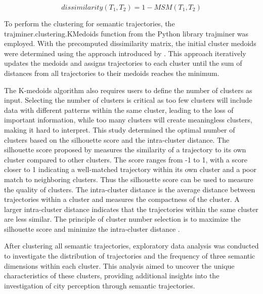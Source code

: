 \documentclass{article}
\theoremstyle{remark}
\begin{document}
\begin{equation} \label{eq:dissimilarity}
    dissimilarity(T_{1},T_{2}) = 1-MSM(T_{1},T_{2})
\end{equation}

To perform the clustering for semantic trajectories, the trajminer.clustering.KMedoids function from the Python library trajminer was employed. With the precomputed dissimilarity matrix, the initial cluster medoids were determined using the approach introduced by \cite{park_simple_2009}. This approach iteratively updates the medoids and assigns trajectories to each cluster until the sum of distances from all trajectories to their medoids reaches the minimum.

The K-medoids algorithm also requires users to define the number of clusters as input. Selecting the number of clusters is critical as too few clusters will include data with different patterns within the same cluster, leading to the loss of important information, while too many clusters will create meaningless clusters, making it hard to interpret. This study determined the optimal number of clusters based on the silhouette score and the intra-cluster distance. The silhouette score proposed by \cite{rousseeuw_silhouettes_1987} measures the similarity of a trajectory to its own cluster compared to other clusters. The score ranges from -1 to 1, with a score closer to 1 indicating a well-matched trajectory within its own cluster and a poor match to neighboring clusters. Thus the silhouette score can be used to measure the quality of clusters. The intra-cluster distance is the average distance between trajectories within a cluster and measures the compactness of the cluster. A larger intra-cluster distance indicates that the trajectories within the same cluster are less similar. The principle of cluster number selection is to maximize the silhouette score and minimize the intra-cluster distance \citep{van_der_merwe_data_2003}.

After clustering all semantic trajectories, exploratory data analysis was conducted to investigate the distribution of trajectories and the frequency of three semantic dimensions within each cluster. This analysis aimed to uncover the unique characteristics of these clusters, providing additional insights into the investigation of city perception through semantic trajectories.

\end{document}
